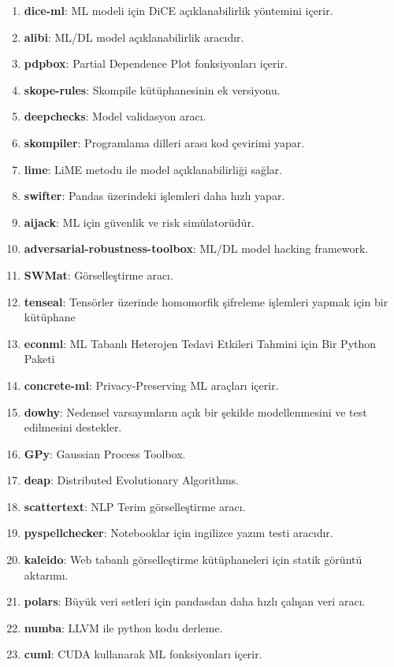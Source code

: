 \begin{enumerate}
    \item \textbf{dice-ml}: ML modeli için DiCE açıklanabilirlik yöntemini içerir.
    \item \textbf{alibi}: ML/DL model açıklanabilirlik aracıdır.
    \item \textbf{pdpbox}: Partial Dependence Plot fonksiyonları içerir.
    \item \textbf{skope-rules}: Skompile kütüphanesinin ek versiyonu.
    \item \textbf{deepchecks}: Model validasyon aracı.
    \item \textbf{skompiler}: Programlama dilleri arası kod çevirimi yapar.
    \item \textbf{lime}: LiME metodu ile model açıklanabilirliği sağlar.
    \item \textbf{swifter}: Pandas üzerindeki işlemleri daha hızlı yapar.
    \item \textbf{aijack}: ML için güvenlik ve risk simülatorüdür.
    \item \textbf{adversarial-robustness-toolbox}: ML/DL model hacking framework.
    \item \textbf{SWMat}: Görselleştirme aracı.
    \item \textbf{tenseal}: Tensörler üzerinde homomorfik şifreleme işlemleri yapmak için bir kütüphane
    \item \textbf{econml}: ML Tabanlı Heterojen Tedavi Etkileri Tahmini için Bir Python Paketi
    \item \textbf{concrete-ml}: Privacy-Preserving ML araçları içerir.
    \item \textbf{dowhy}: Nedensel varsayımların açık bir şekilde modellenmesini ve test edilmesini destekler.
    \item \textbf{GPy}: Gaussian Process Toolbox.
    \item \textbf{deap}: Distributed Evolutionary Algorithms.
    \item \textbf{scattertext}: NLP Terim görselleştirme aracı.
    \item \textbf{pyspellchecker}: Notebooklar için ingilizce yazım testi aracıdır.
    \item \textbf{kaleido}: Web tabanlı görselleştirme kütüphaneleri için statik görüntü aktarımı.
    \item \textbf{polars}: Büyük veri setleri için pandasdan daha hızlı çalışan veri aracı.
    \item \textbf{numba}: LLVM ile python kodu derleme.
    \item \textbf{cuml}: CUDA kullanarak ML fonksiyonları içerir.

\end{enumerate}
